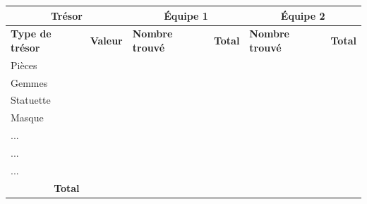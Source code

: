 \documentclass{pirategame}
\begin{document}
\begin{center}
  \begin{tabular}{|p{3cm}|p{2cm}|p{2cm}|p{2cm}|p{2cm}|p{2cm}|}
    \hline
    \multicolumn{2}{|c|}{\textbf{Trésor}} & \multicolumn{2}{c|}{\textbf{Équipe 1}} & \multicolumn{2}{c|}{\textbf{Équipe 2}} \\ \hline
    \textbf{Type de trésor} & \textbf{Valeur} & \textbf{Nombre trouvé} & \textbf{Total} & \textbf{Nombre trouvé} & \textbf{Total} \\ \hline
    Pièces                 &                 &                         &                &                         &                \\ \hline
    Gemmes                 &                 &                         &                &                         &                \\ \hline
    Statuette              &                 &                         &                &                         &                \\ \hline
    Masque                 &                 &                         &                &                         &                \\ \hline
    ...                  &                 &                         &                &                         &                \\ \hline
    ...                  &                 &                         &                &                         &                \\ \hline
    ...                  &                 &                         &                &                         &                \\ \hline
    \multicolumn{2}{|c|}{\textbf{Total}}    &                         &                &                         &                \\ \hline
  \end{tabular}
  \bigskip


\end{center}
\end{document}
